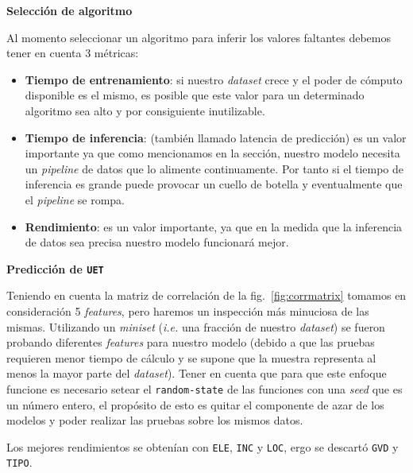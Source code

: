 \documentclass[a4paper,12pt]{article}
\begin{document}
		\hfill
		
		\textbf{Selección de algoritmo}
		
		Al momento seleccionar un algoritmo para inferir los valores faltantes debemos tener en cuenta 3 métricas:
		\begin{itemize}
			\item \textbf{Tiempo de entrenamiento}: si nuestro \textit{dataset} crece y el poder de cómputo disponible es el mismo, es posible que este valor para un determinado algoritmo sea alto y por consiguiente inutilizable.
			\item \textbf{Tiempo de inferencia}: (también llamado latencia de predicción) es un valor importante ya que como mencionamos en la sección, nuestro modelo necesita un \textit{pipeline} de datos que lo alimente continuamente. Por tanto si el tiempo de inferencia es grande puede provocar un cuello de botella y eventualmente que el \textit{pipeline} se rompa.
			\item \textbf{Rendimiento}: es un valor importante, ya que en la medida que la inferencia de datos sea precisa nuestro modelo funcionará mejor.
		\end{itemize}
		
		\textbf{Predicción de \texttt{UET}}
		
		Teniendo en cuenta la matriz de correlación de la fig.~\ref{fig:corrmatrix} tomamos en consideración 5 \textit{features}, pero haremos un inspección más minuciosa de las mismas. Utilizando un \textit{miniset} (\textit{i.e.} una fracción de nuestro \textit{dataset}) se fueron probando diferentes \textit{features} para nuestro modelo (debido a que las pruebas requieren menor tiempo de cálculo y se supone que la muestra representa al menos la mayor parte del \textit{dataset}). Tener en cuenta que para que este enfoque funcione es necesario setear el \texttt{random-state} de las funciones con una \textit{seed} que es un número entero, el propósito de esto es quitar el componente de azar de los modelos y poder realizar las pruebas sobre los mismos datos.
		
		Los mejores rendimientos se obtenían con \texttt{ELE}, \texttt{INC} y \texttt{LOC}, ergo se descartó \texttt{GVD} y \texttt{TIPO}.
		
\end{document}
